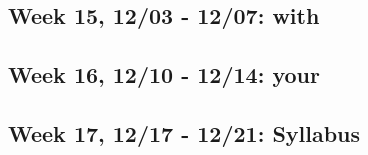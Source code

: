 \documentclass[11pt,]{article}
\begin{document}
\hypertarget{week-15-1203---1207-with}{%
\subsection{Week 15, 12/03 - 12/07:
with}\label{week-15-1203---1207-with}}

\hypertarget{week-16-1210---1214-your}{%
\subsection{Week 16, 12/10 - 12/14:
your}\label{week-16-1210---1214-your}}

\hypertarget{week-17-1217---1221-syllabus}{%
\subsection{Week 17, 12/17 - 12/21:
Syllabus}\label{week-17-1217---1221-syllabus}}
\end{document}
